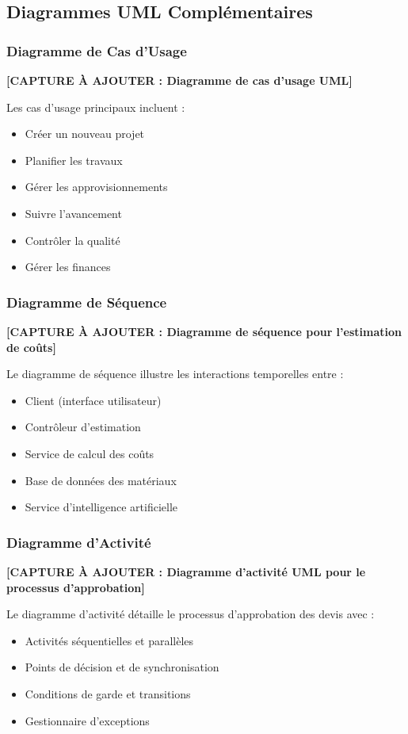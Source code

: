 \subsection{Diagrammes UML Complémentaires}

\subsubsection{Diagramme de Cas d'Usage}

\textbf{[CAPTURE À AJOUTER : Diagramme de cas d'usage UML]}

Les cas d'usage principaux incluent :
\begin{itemize}
    \item Créer un nouveau projet
    \item Planifier les travaux
    \item Gérer les approvisionnements
    \item Suivre l'avancement
    \item Contrôler la qualité
    \item Gérer les finances
\end{itemize}

\subsubsection{Diagramme de Séquence}

\textbf{[CAPTURE À AJOUTER : Diagramme de séquence pour l'estimation de coûts]}

Le diagramme de séquence illustre les interactions temporelles entre :
\begin{itemize}
    \item Client (interface utilisateur)
    \item Contrôleur d'estimation
    \item Service de calcul des coûts
    \item Base de données des matériaux
    \item Service d'intelligence artificielle
\end{itemize}

\subsubsection{Diagramme d'Activité}

\textbf{[CAPTURE À AJOUTER : Diagramme d'activité UML pour le processus d'approbation]}

Le diagramme d'activité détaille le processus d'approbation des devis avec :
\begin{itemize}
    \item Activités séquentielles et parallèles
    \item Points de décision et de synchronisation
    \item Conditions de garde et transitions
    \item Gestionnaire d'exceptions
\end{itemize}


